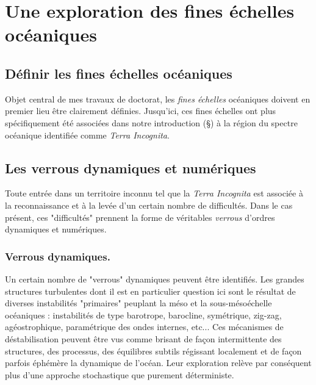 \section{Une exploration des fines échelles océaniques}
\subsection{Définir les fines échelles océaniques}
Objet central de mes travaux de doctorat, les \textit{fines échelles} océaniques doivent en premier lieu être clairement définies. Jusqu'ici, ces fines échelles ont plus spécifiquement été associées dans notre introduction (\S {}) à la région du spectre océanique identifiée comme \textit{Terra Incognita}.\\

\noindent{}

\subsection{Les verrous dynamiques et numériques}
\label{subsection_verrous}


Toute entrée dans un territoire inconnu tel que la \textit{Terra Incognita} est associée à la reconnaissance et à la levée d'un certain nombre de difficultés. Dans le cas présent, ces "difficultés" prennent la forme de véritables \textit{verrous} d'ordres dynamiques et numériques.

\subsubsection{Verrous dynamiques.}
Un certain nombre de "verrous" dynamiques peuvent être identifiés. Les grandes structures turbulentes dont il est en particulier question ici sont le résultat de diverses instabilités "primaires" peuplant la méso et la sous-mésoéchelle océaniques : instabilités de type barotrope, barocline, symétrique, zig-zag, agéostrophique, paramétrique des ondes internes, etc... Ces mécanismes de déstabilisation peuvent être vus comme brisant de façon intermittente des structures, des processus, des équilibres subtils régissant localement et de façon parfois éphémère la dynamique de l'océan. Leur exploration relève par conséquent plus d'une approche stochastique que purement déterministe.

